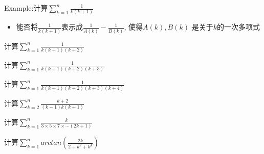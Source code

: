 \clearpage 
Example:计算$\sum_{k=1}^n\frac{1}{k(k+1)}$
\clearpage
\begin{itemize}
\item 能否将$\frac{1}{k(k+1)}$表示成$\frac{1}{A(k)}-\frac{1}{B(k)}$, 使得$A(k), B(k)$
 	  是关于$k$的一次多项式
\end{itemize}

\clearpage
计算$\sum_{k=1}^n\frac{1}{k(k+1)(k+2)}$

计算$\sum_{k=1}^n\frac{1}{k(k+1)(k+2)(k+3)}$

计算$\sum_{k=1}^n\frac{1}{k(k+1)(k+2)(k+3)(k+4)}$

计算$\sum_{k=2}^n\frac{k+2}{(k-1)k(k+1)}$

计算$\sum_{k=1}^n\frac{k}{3\times 5\times 7\times\cdots (2k+1)}$

计算$\sum_{k=1}^narctan(\frac{2k}{2+k^2+k^4})$
